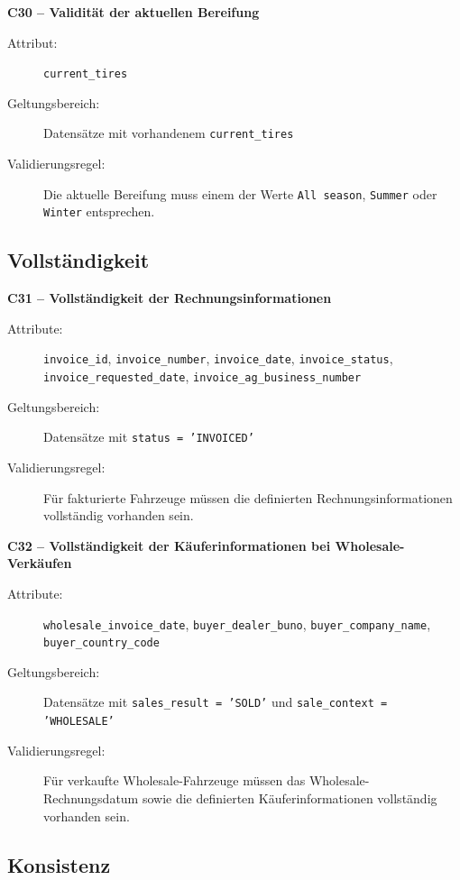 \documentclass[../main.tex]{subfiles}
\begin{document}
\medskip
\noindent\textbf{C30 -- Validität der aktuellen Bereifung}
\begin{description}
    \item[Attribut:] \texttt{current\_tires}
    \item[Geltungsbereich:] Datensätze mit vorhandenem \texttt{current\_tires}
    \item[Validierungsregel:] Die aktuelle Bereifung muss einem der Werte \texttt{All season}, \texttt{Summer} oder \texttt{Winter} entsprechen.
\end{description}

\subsection{Vollständigkeit}

\medskip
\noindent\textbf{C31 -- Vollständigkeit der Rechnungsinformationen}
\begin{description}
    \item[Attribute:] \texttt{invoice\_id}, \texttt{invoice\_number}, \texttt{invoice\_date}, \texttt{invoice\_status}, \texttt{invoice\_requested\_date}, \texttt{invoice\_ag\_business\_number}
    \item[Geltungsbereich:] Datensätze mit \texttt{status = 'INVOICED'}
    \item[Validierungsregel:] Für fakturierte Fahrzeuge müssen die definierten Rechnungsinformationen vollständig vorhanden sein.
\end{description}

\medskip
\noindent\textbf{C32 -- Vollständigkeit der Käuferinformationen bei Wholesale-Verkäufen}
\begin{description}
    \item[Attribute:] \texttt{wholesale\_invoice\_date}, \texttt{buyer\_dealer\_buno}, \texttt{buyer\_company\_name}, \texttt{buyer\_country\_code}
    \item[Geltungsbereich:] Datensätze mit \texttt{sales\_result = 'SOLD'} und \texttt{sale\_context = 'WHOLESALE'}
    \item[Validierungsregel:] Für verkaufte Wholesale-Fahrzeuge müssen das Wholesale-Rechnungsdatum sowie die definierten Käuferinformationen vollständig vorhanden sein.
\end{description}

\subsection{Konsistenz}
\end{document}
